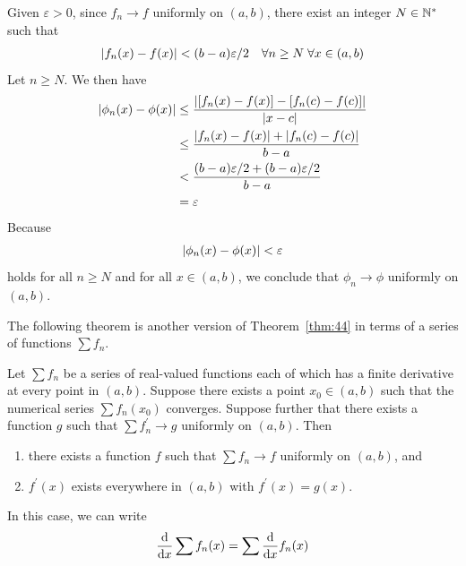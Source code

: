 \documentclass[thmcnt=section, 12pt]{my-elegantbook}
\begin{document}
\begin{solution}
    Given $\varepsilon > 0$, since $f_n \to f$ uniformly on $(a, b)$, there exist an integer $N \in \mathbb{N}^\ast$ such that
    \begin{align*}
        \left\lvert f_n(x) - f(x) \right\rvert < (b - a) \varepsilon / 2
        \quad \forall n \geq N \;
        \forall x \in (a, b)
    \end{align*}
    Let $n \geq N$. We then have
    \begin{align*}
        \left\lvert \phi_n(x) - \phi(x) \right\rvert
         & \leq \frac{\left\lvert  [f_n(x) - f(x)] - [f_n(c) - f(c)]  \right\rvert}{\left\lvert x - c \right\rvert} \\
         & \leq \frac{\left\lvert f_n(x) - f(x) \right\rvert + \left\lvert f_n(c) - f(c) \right\rvert}{b - a}       \\
         & < \frac{(b - a) \varepsilon / 2 + (b - a) \varepsilon / 2}{b - a}  \\
         & = \varepsilon
    \end{align*}
    Because
    \begin{align*}
        \left\lvert \phi_n(x) - \phi(x) \right\rvert < \varepsilon
    \end{align*}
    holds for all $n \geq N$ and for all $x \in (a, b)$, we conclude that $\phi_n \to \phi$ uniformly on $(a, b)$.
\end{solution}


The following theorem is another version of Theorem~\ref{thm:44} in terms of a series of functions $\sum f_n$.

\begin{theorem} \label{thm:45}
    Let $\sum f_n$ be a series of real-valued functions each of which has a finite derivative at every point in $(a, b)$. Suppose there exists a point $x_0 \in (a, b)$ such that the numerical series $\sum f_n(x_0)$ converges. Suppose further that there exists a function $g$ such that $\sum f^\prime_n \to g$ uniformly on $(a, b)$. Then
    \begin{enumerate}
        \item there exists a function $f$ such that $\sum f_n \to f$ uniformly on $(a, b)$, and
        \item $f^\prime(x)$ exists everywhere in $(a, b)$ with $f^\prime(x) = g(x)$.
    \end{enumerate}
    In this case, we can write
    \begin{align}
        \odvs{\sum f_n(x)}{x}
        = \sum \odvs{f_n(x)}{x}
        \label{eq:103}
    \end{align}
\end{theorem}
\end{document}
